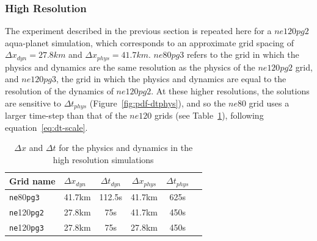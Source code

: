 \documentclass{agujournal}
\begin{document}
\subsubsection{High Resolution}\label{sec:hires}

The experiment described in the previous section is repeated here for a $ne120pg2$ aqua-planet simulation, which corresponds to an approximate grid spacing of $\Delta x_{dyn} = 27.8km$ and $\Delta x_{phys} = 41.7km$. $ne80pg3$ refers to the grid in which the physics and dynamics are the same resolution as the physics of the $ne120pg2$ grid, and $ne120pg3$, the grid in which the physics and dynamics are equal to the resolution of the dynamics of $ne120pg2$. At these higher resolutions, the solutions are sensitive to $\Delta t_{phys}$ (Figure~\ref{fig:pdf-dtphys}), and so the $ne80$ grid uses a larger time-step than that of the $ne120$ grids (see Table~\ref{table:grids-hi}), following equation~\ref{eq:dt-scale}.

 \begin{table}
 \caption{$\Delta x$ and $\Delta t$ for the physics and dynamics in the high resolution simulations}
 \centering
 \begin{tabular}{llcccc}
 \hline
 Grid name & $\Delta x_{dyn}$  & $\Delta t_{dyn}$ & $\Delta x_{phys}$  & $\Delta t_{phys}$ \\
 \hline
   {\tt{ne}}80{\tt{pg3}}  & 41.7km & 112.5s  & 41.7km & 625s \\
   {\tt{ne}}120{\tt{pg2}}  & 27.8km & 75s  & 41.7km & 450s \\
   {\tt{ne}}120{\tt{pg3}}  & 27.8km & 75s  & 27.8km & 450s \\
 \hline
 \end{tabular}
 \label{table:grids-hi}
 \end{table}
 
\end{document}
